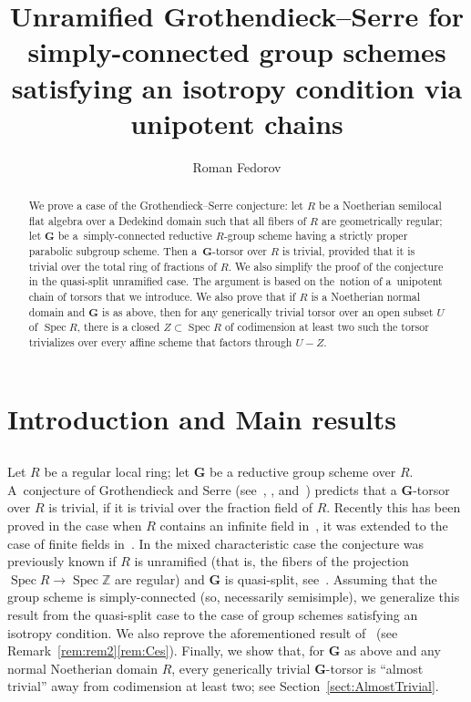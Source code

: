 \documentclass[11pt]{amsart}
\title[Grothendieck--Serre for isotropic group schemes]{Unramified Grothendieck--Serre for simply-connected group schemes satisfying an isotropy condition via unipotent chains}
\author{Roman Fedorov}
\DeclareMathOperator\Spec{{Spec}}
\theoremstyle{plain}
\theoremstyle{definition}
\theoremstyle{remark}
\newcommand\bG{{\mathbf G}}
\newcommand\Z{\mathbb Z}
\begin{document}
\begin{abstract}
We prove a case of the Grothendieck--Serre conjecture: let $R$ be a Noetherian semilocal flat algebra over a Dedekind domain such that all fibers of $R$ are geometrically regular; let $\mathbf G$ be a~simply-connected reductive $R$-group scheme having a strictly proper parabolic subgroup scheme. Then a~$\mathbf G$-torsor over $R$ is trivial, provided that it is trivial over the total ring of fractions of $R$. We also simplify the proof of the conjecture in the quasi-split unramified case. The argument is based on the~notion of a~unipotent chain of torsors that we introduce. We also prove that if $R$ is a Noetherian normal domain and $\mathbf G$ is as above, then for any generically trivial torsor over an open subset $U$ of $\mathop{\mathrm{Spec}}R$, there is a closed $Z\subset\mathop{\mathrm{Spec}}R$ of codimension at least two such the torsor trivializes over every affine scheme that factors through $U-Z$.
\end{abstract}

\maketitle

\section{Introduction and Main results}
\subsection{} Let $R$ be a regular local ring; let $\bG$ be a reductive group scheme over $R$. A~conjecture of Grothendieck and Serre (see~\cite[remarque, p.31]{SerreFibres}, \cite[remarque~3, p.26-27]{GrothendieckTorsion}, and~\cite[remarque~1.11.a]{GrothendieckBrauer2}) predicts that a $\bG$-torsor over $R$ is trivial, if it is trivial over the fraction field of $R$. Recently this has been proved in the case when $R$ contains an infinite field in~\cite{FedorovPanin}, it was extended to the case of finite fields in~\cite{PaninFiniteFieldsIzvestiya}. In the mixed characteristic case the conjecture was previously known if $R$ is unramified (that is, the fibers of the projection $\Spec R\to\Spec\Z$ are regular) and $\bG$ is quasi-split, see~\cite{CesnaviciusGrSerre}. Assuming that the group scheme is simply-connected (so, necessarily semisimple), we generalize this result from the quasi-split case to the case of group schemes satisfying an isotropy condition. We also reprove the aforementioned result of~\cite{CesnaviciusGrSerre} (see Remark~\ref{rem:rem2}\eqref{rem:Ces}). Finally, we show that, for $\bG$ as above and any normal Noetherian domain $R$, every generically trivial $\bG$-torsor is ``almost trivial'' away from codimension at least two; see Section~\ref{sect:AlmostTrivial}.
\end{document}
